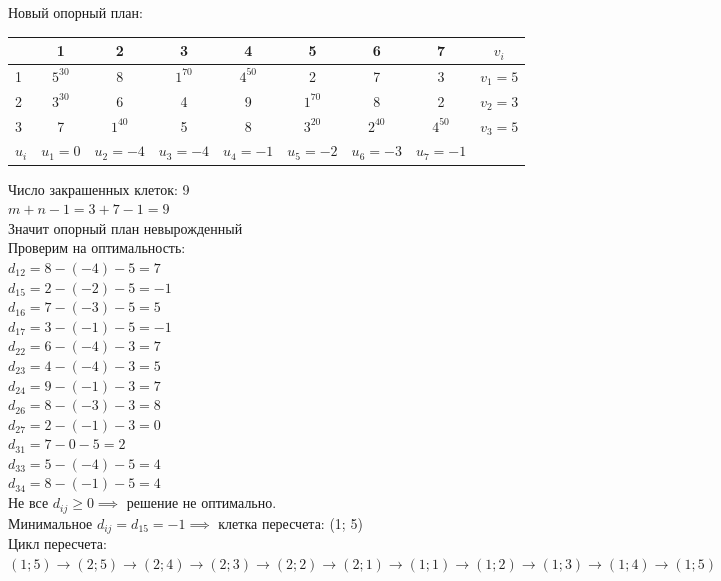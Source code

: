 Новый опорный план:
\begin{center}
    \begin{tabular}{|a | c | c | c | c | c | c | c | c|} 
         \hline
            & 1 & 2 & 3 & 4 & 5 & 6 & 7 & $v_{i}$\\
          &  $5^{30}$ & 8 &  $1^{70}$ &  $4^{50}$ & 2 & 7 & 3 & {\small$v_1 = 5$}\\
          &  $3^{30}$ & 6 & 4 & 9 &  $1^{70}$ & 8 & 2 & {\small$v_2 = 3$}\\
          & 7 &  $1^{40}$ & 5 & 8 &  $3^{20}$ &  $2^{40}$ &  $4^{50}$ & {\small$v_3 = 5$}\\
         \hline
            $u_{i}$ & {\small$u_1 = 0$} & {\small$u_2 = -4$} & {\small$u_3 = -4$} & {\small$u_4 = -1$} & {\small$u_5 = -2$} & {\small$u_6 = -3$} & {\small$u_7 = -1$} & \\
        \hline
    \end{tabular}
\end{center}

\begin{flushleft}
Число закрашенных клеток: 9\\
$m + n - 1 = 3 + 7 - 1 = 9$\\
Значит опорный план невырожденный\\
Проверим на оптимальность:\\
$d_{12} = 8 - (-4) - 5 = 7$\\
$d_{15} = 2 - (-2) - 5 = -1$\\
$d_{16} = 7 - (-3) - 5 = 5$\\
$d_{17} = 3 - (-1) - 5 = -1$\\
$d_{22} = 6 - (-4) - 3 = 7$\\
$d_{23} = 4 - (-4) - 3 = 5$\\
$d_{24} = 9 - (-1) - 3 = 7$\\
$d_{26} = 8 - (-3) - 3 = 8$\\
$d_{27} = 2 - (-1) - 3 = 0$\\
$d_{31} = 7 - 0 - 5 = 2$\\
$d_{33} = 5 - (-4) - 5 = 4$\\
$d_{34} = 8 - (-1) - 5 = 4$\\
Не все $d_{ij} \ge 0 \implies$ решение не оптимально.\\
Минимальное $d_{ij} = d_{15} = -1 \implies$ клетка пересчета: (1; 5)\\
Цикл пересчета:\\
$(1; 5) \rightarrow (2; 5) \rightarrow (2; 4) \rightarrow (2; 3) \rightarrow (2; 2) \rightarrow (2; 1) \rightarrow (1; 1) \rightarrow (1; 2) \rightarrow (1; 3) \rightarrow (1; 4) \rightarrow (1; 5)$
\end{flushleft}

